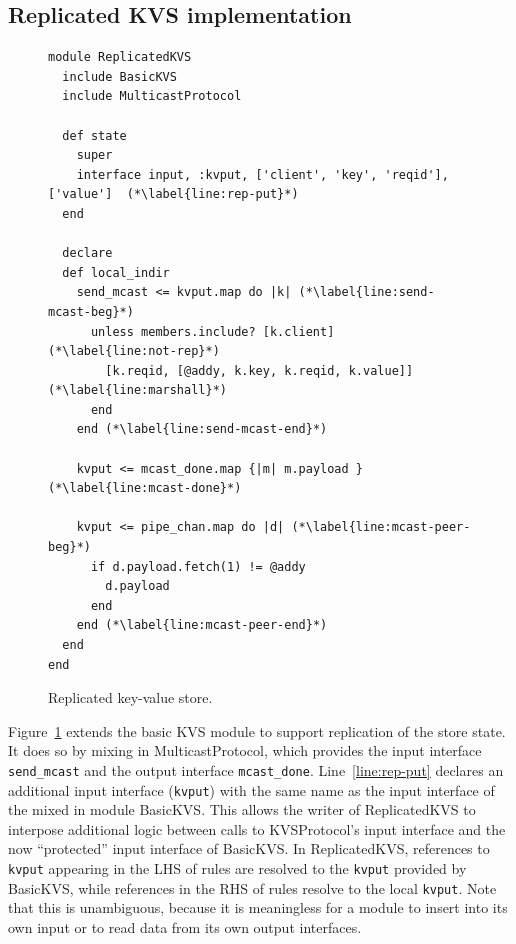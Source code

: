 \subsection{Replicated KVS implementation}
\begin{figure}[t]
\begin{scriptsize}
\begin{lstlisting}
module ReplicatedKVS
  include BasicKVS
  include MulticastProtocol

  def state
    super
    interface input, :kvput, ['client', 'key', 'reqid'], ['value']  (*\label{line:rep-put}*)
  end

  declare
  def local_indir
    send_mcast <= kvput.map do |k| (*\label{line:send-mcast-beg}*)
      unless members.include? [k.client]  (*\label{line:not-rep}*)
        [k.reqid, [@addy, k.key, k.reqid, k.value]]   (*\label{line:marshall}*)            
      end
    end (*\label{line:send-mcast-end}*)
    
    kvput <= mcast_done.map {|m| m.payload }  (*\label{line:mcast-done}*)

    kvput <= pipe_chan.map do |d| (*\label{line:mcast-peer-beg}*)
      if d.payload.fetch(1) != @addy
        d.payload
      end
    end (*\label{line:mcast-peer-end}*)
  end
end
\end{lstlisting}
\vspace{-10pt}
\caption{Replicated key-value store.}
\label{fig:kvs-repl}
\end{scriptsize}
\vspace{-2pt}
\end{figure}


Figure~\ref{fig:kvs-repl} extends the basic KVS module to support replication of
the store state.  It does so by mixing in MulticastProtocol, which provides the
input interface \texttt{send\_mcast} and the output interface
\texttt{mcast\_done}.  Line~\ref{line:rep-put} declares an additional input
interface (\texttt{kvput}) with the same name as the input interface of the
mixed in module BasicKVS.  This allows the writer of ReplicatedKVS to interpose
additional logic between calls to KVSProtocol's input interface and the now
``protected'' input interface of BasicKVS.  In ReplicatedKVS, references to
\texttt{kvput} appearing in the LHS of rules are resolved to the \texttt{kvput}
provided by BasicKVS, while references in the RHS of rules resolve to the local
\texttt{kvput}.  Note that this is unambiguous, because it is meaningless for a
module to insert into its own input or to read data from its own output
interfaces.

